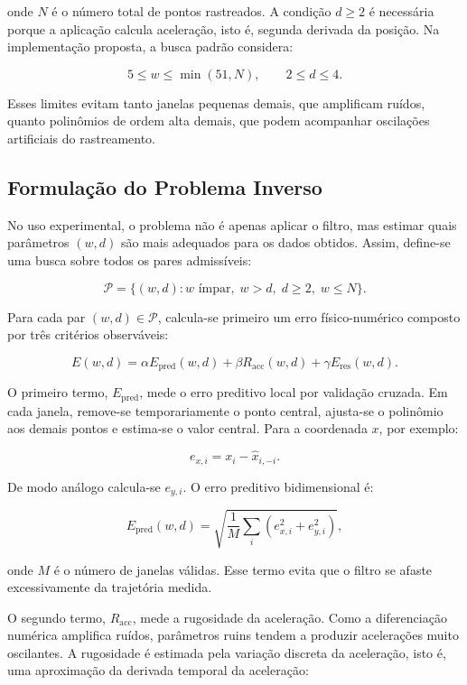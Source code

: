 onde $N$ é o número total de pontos rastreados. A condição $d\geq2$ é necessária porque a aplicação calcula aceleração, isto é, segunda derivada da posição. Na implementação proposta, a busca padrão considera:

\[
    5\leq w\leq \min(51,N),
    \qquad
    2\leq d\leq 4.
\]

Esses limites evitam tanto janelas pequenas demais, que amplificam ruídos, quanto polinômios de ordem alta demais, que podem acompanhar oscilações artificiais do rastreamento.

\subsection{Formulação do Problema Inverso}

No uso experimental, o problema não é apenas aplicar o filtro, mas estimar quais parâmetros $(w,d)$ são mais adequados para os dados obtidos. Assim, define-se uma busca sobre todos os pares admissíveis:

\[
    \mathcal{P}=
    \{(w,d): w \text{ ímpar},\; w>d,\; d\geq2,\; w\leq N\}.
\]

Para cada par $(w,d)\in\mathcal{P}$, calcula-se primeiro um erro físico-numérico composto por três critérios observáveis:

\[
    E(w,d)
    =
    \alpha E_{\text{pred}}(w,d)
    +
    \beta R_{\text{acc}}(w,d)
    +
    \gamma E_{\text{res}}(w,d).
\]

O primeiro termo, $E_{\text{pred}}$, mede o erro preditivo local por validação cruzada. Em cada janela, remove-se temporariamente o ponto central, ajusta-se o polinômio aos demais pontos e estima-se o valor central. Para a coordenada $x$, por exemplo:

\[
    e_{x,i}=x_i-\hat{x}_{i,-i}.
\]

De modo análogo calcula-se $e_{y,i}$. O erro preditivo bidimensional é:

\[
    E_{\text{pred}}(w,d)
    =
    \sqrt{
    \frac{1}{M}
    \sum_{i}
    \left(e_{x,i}^2+e_{y,i}^2\right)
    },
\]

onde $M$ é o número de janelas válidas. Esse termo evita que o filtro se afaste excessivamente da trajetória medida.

O segundo termo, $R_{\text{acc}}$, mede a rugosidade da aceleração. Como a diferenciação numérica amplifica ruídos, parâmetros ruins tendem a produzir acelerações muito oscilantes. A rugosidade é estimada pela variação discreta da aceleração, isto é, uma aproximação da derivada temporal da aceleração:

